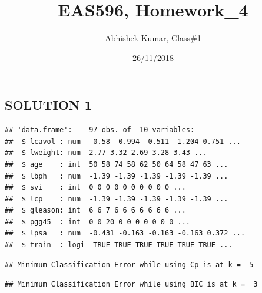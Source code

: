 \documentclass[]{article}
\title{EAS596, Homework\_4}
\author{Abhishek Kumar, Class\#1}
\date{26/11/2018}
\begin{document}
\maketitle

\subsection{SOLUTION 1}\label{solution-1}

\begin{verbatim}
## 'data.frame':    97 obs. of  10 variables:
##  $ lcavol : num  -0.58 -0.994 -0.511 -1.204 0.751 ...
##  $ lweight: num  2.77 3.32 2.69 3.28 3.43 ...
##  $ age    : int  50 58 74 58 62 50 64 58 47 63 ...
##  $ lbph   : num  -1.39 -1.39 -1.39 -1.39 -1.39 ...
##  $ svi    : int  0 0 0 0 0 0 0 0 0 0 ...
##  $ lcp    : num  -1.39 -1.39 -1.39 -1.39 -1.39 ...
##  $ gleason: int  6 6 7 6 6 6 6 6 6 6 ...
##  $ pgg45  : int  0 0 20 0 0 0 0 0 0 0 ...
##  $ lpsa   : num  -0.431 -0.163 -0.163 -0.163 0.372 ...
##  $ train  : logi  TRUE TRUE TRUE TRUE TRUE TRUE ...
\end{verbatim}

\begin{verbatim}
## Minimum Classification Error while using Cp is at k =  5
\end{verbatim}

\begin{verbatim}
## Minimum Classification Error while using BIC is at k =  3
\end{verbatim}
\end{document}
